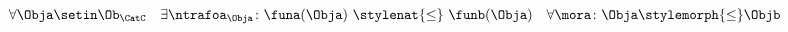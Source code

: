 {\begin{forslides}

    \begin{equation}\label{eq:ex_nt_27}
        \forall \Obja \setin\Ob_\CatC \quad \exists \ntrafoa_{\Obja} \colon \funa(\Obja) \ \stylenat{\leq} \  \funb(\Obja) \quad  \forall \mora \colon \Obja \stylemorph{\leq} \Objb
    \end{equation}



\end{forslides}

}
